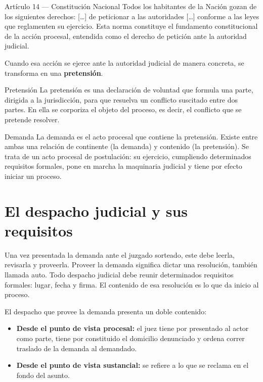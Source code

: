 \documentclass[12pt,oneside]{book}
\begin{document}
\begin{definition}{Artículo 14 --- Constitución Nacional}
Todos los habitantes de la Nación gozan de los siguientes derechos: [\ldots] de peticionar a las autoridades [\ldots] conforme a las leyes que reglamenten su ejercicio. Esta norma constituye el fundamento constitucional de la acción procesal, entendida como el derecho de petición ante la autoridad judicial.
\end{definition}

Cuando esa acción se ejerce ante la autoridad judicial de manera concreta, se transforma en una \textbf{pretensión}.

\begin{definition}{Pretensión}
La pretensión es una declaración de voluntad que formula una parte, dirigida a la jurisdicción, para que resuelva un conflicto suscitado entre dos partes. En ella se corporiza el objeto del proceso, es decir, el conflicto que se pretende resolver.
\end{definition}

\begin{definition}{Demanda}
La demanda es el acto procesal que contiene la pretensión. Existe entre ambas una relación de continente (la demanda) y contenido (la pretensión). Se trata de un acto procesal de postulación: su ejercicio, cumpliendo determinados requisitos formales, pone en marcha la maquinaria judicial y tiene por efecto iniciar un proceso.
\end{definition}

\section{El despacho judicial y sus requisitos}

Una vez presentada la demanda ante el juzgado sorteado, este debe leerla, revisarla y proveerla. Proveer la demanda significa dictar una resolución, también llamada auto. Todo despacho judicial debe reunir determinados requisitos formales: lugar, fecha y firma. El contenido de esa resolución es lo que da inicio al proceso.

El despacho que provee la demanda presenta un doble contenido:

\begin{itemize}
    \item \textbf{Desde el punto de vista procesal:} el juez tiene por presentado al actor como parte, tiene por constituido el domicilio denunciado y ordena correr traslado de la demanda al demandado.
    \item \textbf{Desde el punto de vista sustancial:} se refiere a lo que se reclama en el fondo del asunto.
\end{itemize}
\end{document}
